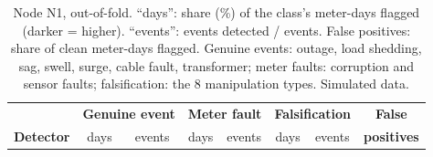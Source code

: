 \documentclass[11pt,a4paper]{article}
\begin{document}
\begin{table}[H]
\centering
\small
\setlength{\tabcolsep}{4pt}
\begin{tabular}{@{}l cc cc cc |c@{}}
\toprule
 & \multicolumn{2}{c}{\textbf{Genuine event}} & \multicolumn{2}{c}{\textbf{Meter fault}} & \multicolumn{2}{c|}{\textbf{Falsification}} & \textbf{False} \\
\textbf{Detector} & days & events & days & events & days & events & \textbf{positives} \\
\midrule
\end{tabular}
\caption{Node N1, out-of-fold. ``days'': share (\%) of the class's meter-days flagged (darker = higher).
``events'': events detected / events. False positives: share of clean meter-days flagged. Genuine events:
outage, load shedding, sag, swell, surge, cable fault, transformer; meter faults: corruption and sensor faults;
falsification: the 8 manipulation types. Simulated data.}
\label{tab:experiment}
\end{table}

\begin{table}[H]
\centering
\small
\setlength{\tabcolsep}{4pt}
\caption{The \nRare{} falsification and sensor-fault events of N1, one by one (most types occur once, so
percentages per type would be meaningless). R = rules, z = robust $z$, C = CUSUM, IF, SVM, AE = autoencoder.
First flag and days flagged refer to the whole stack. Balance alarm: first day the CUSUM on the feeder's daily
energy-balance gap fires (it is in alarm on \balFPR\% of clean feeder-days); it names a feeder, not a meter.}
\label{tab:events}
\end{table}

\end{document}
